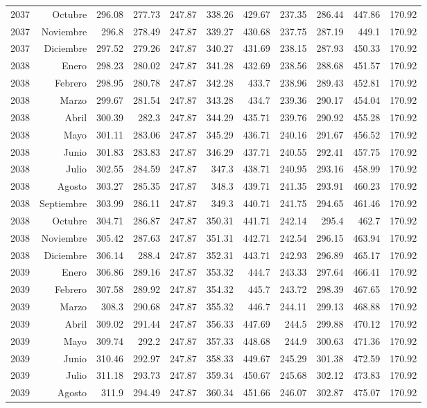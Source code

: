 \documentclass{article}%
\begin{document}
\begin{longtable}{|l r|r|r|r|r|r|r|r|r|r|}
2037&Octubre&296.08&277.73&247.87&338.26&429.67&237.35&286.44&447.86&170.92\\%
2037&Noviembre&296.8&278.49&247.87&339.27&430.68&237.75&287.19&449.1&170.92\\%
2037&Diciembre&297.52&279.26&247.87&340.27&431.69&238.15&287.93&450.33&170.92\\%
2038&Enero&298.23&280.02&247.87&341.28&432.69&238.56&288.68&451.57&170.92\\%
2038&Febrero&298.95&280.78&247.87&342.28&433.7&238.96&289.43&452.81&170.92\\%
2038&Marzo&299.67&281.54&247.87&343.28&434.7&239.36&290.17&454.04&170.92\\%
2038&Abril&300.39&282.3&247.87&344.29&435.71&239.76&290.92&455.28&170.92\\%
2038&Mayo&301.11&283.06&247.87&345.29&436.71&240.16&291.67&456.52&170.92\\%
2038&Junio&301.83&283.83&247.87&346.29&437.71&240.55&292.41&457.75&170.92\\%
2038&Julio&302.55&284.59&247.87&347.3&438.71&240.95&293.16&458.99&170.92\\%
2038&Agosto&303.27&285.35&247.87&348.3&439.71&241.35&293.91&460.23&170.92\\%
2038&Septiembre&303.99&286.11&247.87&349.3&440.71&241.75&294.65&461.46&170.92\\%
2038&Octubre&304.71&286.87&247.87&350.31&441.71&242.14&295.4&462.7&170.92\\%
2038&Noviembre&305.42&287.63&247.87&351.31&442.71&242.54&296.15&463.94&170.92\\%
2038&Diciembre&306.14&288.4&247.87&352.31&443.71&242.93&296.89&465.17&170.92\\%
2039&Enero&306.86&289.16&247.87&353.32&444.7&243.33&297.64&466.41&170.92\\%
2039&Febrero&307.58&289.92&247.87&354.32&445.7&243.72&298.39&467.65&170.92\\%
2039&Marzo&308.3&290.68&247.87&355.32&446.7&244.11&299.13&468.88&170.92\\%
2039&Abril&309.02&291.44&247.87&356.33&447.69&244.5&299.88&470.12&170.92\\%
2039&Mayo&309.74&292.2&247.87&357.33&448.68&244.9&300.63&471.36&170.92\\%
2039&Junio&310.46&292.97&247.87&358.33&449.67&245.29&301.38&472.59&170.92\\%
2039&Julio&311.18&293.73&247.87&359.34&450.67&245.68&302.12&473.83&170.92\\%
2039&Agosto&311.9&294.49&247.87&360.34&451.66&246.07&302.87&475.07&170.92\\%

\end{longtable}
\end{document}
